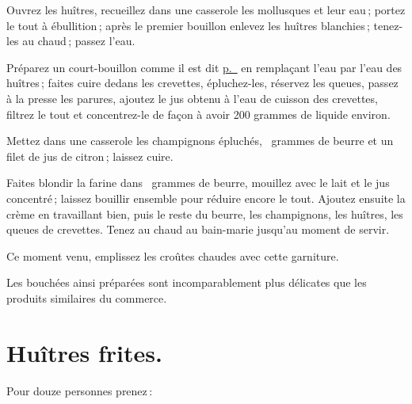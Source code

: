 Ouvrez les huîtres, recueillez dans une casserole les mollusques et leur eau ;
portez le tout à ébullition ; après le premier bouillon enlevez les huîtres
blanchies ; tenez-les au chaud ; passez l'eau.

Préparez un court-bouillon comme il est dit \hyperlink{p0287}{p. \pageref{pg0287}}
en remplaçant l'eau par l'eau des huîtres ; faites cuire dedans les crevettes,
épluchez-les, réservez les queues, passez à la presse les parures, ajoutez le
jus obtenu à l'eau de cuisson des crevettes, filtrez le tout et concentrez-le
de façon à avoir 200 grammes de liquide environ.

Mettez dans une casserole les champignons épluchés, {\mmm} grammes de beurre et
un filet de jus de citron ; laissez cuire.

Faites blondir la farine dans {\mmm} grammes de beurre, mouillez avec le lait et
le jus concentré ; laissez bouillir ensemble pour réduire encore le tout.
Ajoutez ensuite la crème en travaillant bien, puis le reste du beurre, les
champignons, les huîtres, les queues de crevettes. Tenez au chaud au bain-marie
jusqu'au moment de servir.

Ce moment venu, emplissez les croûtes chaudes avec cette garniture.

Les bouchées ainsi préparées sont incomparablement plus délicates que les
produits similaires du commerce.

\section*{\centering Huîtres frites.}

Pour douze personnes prenez :

\medskip

